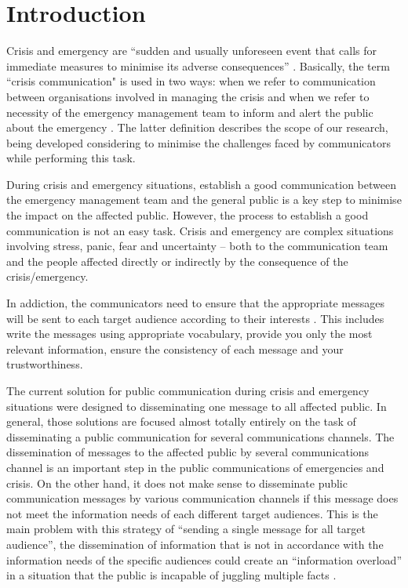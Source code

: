 \section{Introduction}

Crisis and emergency are ``sudden and usually unforeseen event that calls for immediate measures to minimise its adverse consequences'' \citep{dha1992internationally}. Basically, the term ``crisis communication" is used in two ways: when we refer to communication between organisations involved in managing the crisis and when we refer to necessity of the emergency management team to inform and alert the public about the emergency \citep{cdc2014}. The latter definition describes the scope of our research, being developed considering to minimise the challenges faced by communicators while performing this task. 

During crisis and emergency situations, establish a good communication between the emergency management team and the general public is a key step to minimise the impact on the affected public. However, the process to establish a good communication is not an easy task. Crisis and emergency are complex situations involving stress, panic, fear and uncertainty \citep{reynolds2007crisis} -- both to the communication team and the people affected directly or indirectly by the consequence of the crisis/emergency.

In addiction, the communicators need to ensure that the appropriate messages will be sent to each target audience according to their interests \citep{panamericanhealthorganization2009}. This includes write the messages using appropriate vocabulary, provide you only the most relevant information, ensure the consistency of each message and your trustworthiness. 

The current solution for public communication during crisis and emergency situations were designed to disseminating one message to all affected public. In general, those solutions are focused almost totally entirely on the task of disseminating a public communication for several communications channels. The dissemination of messages to the affected public by several communications channel is an important step in the public communications of emergencies and crisis. On the other hand, it does not make sense to disseminate public communication messages by various communication channels if this message does not meet the information needs of each different target audiences. This is the main problem with this strategy of ``sending a single message for all target audience'', the dissemination of information that is not in accordance with the information needs of the specific audiences could create an ``information overload'' in a situation that the public is incapable of juggling multiple facts \citep{cdc2014}. 


